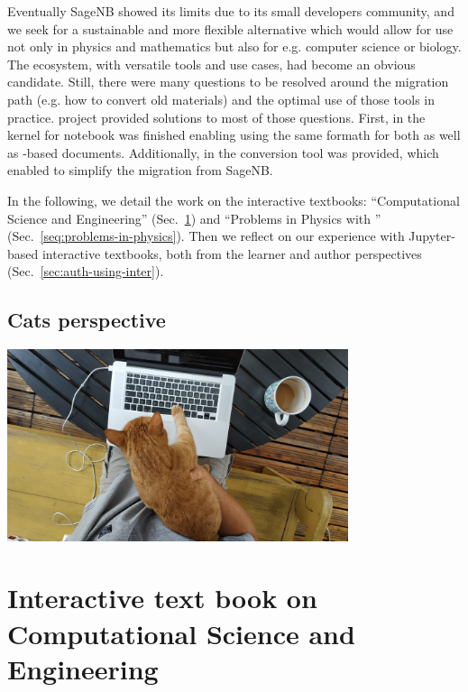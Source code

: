 \documentclass{deliverablereport}
\newcommand{\sagenb}{SageNB\xspace}
\begin{document}
Eventually \sagenb showed its limits due to its small developers
community, and we seek for a sustainable and more flexible alternative
which would allow for use not only in physics and mathematics but also
for e.g. computer science or biology. The \Jupyter ecosystem, with
versatile tools and use cases, had become an obvious candidate. Still,
there were many questions to be resolved around the migration path
(e.g. how to convert old materials) and the optimal use of those tools
in practice.  \ODK project provided solutions to most of those
questions. First, in  the
\SageMath kernel for \Jupyter notebook was finished enabling using the
same formath for both \Sage as well as \Python-based
documents. Additionally, in  the
conversion tool was provided, which enabled to simplify the migration
from \sagenb. 

In the following, we detail the work on the interactive textbooks:
``Computational Science and Engineering'' (Sec.~\ref{sec:computational-science-and-engineering})
and ``Problems in Physics with \SageMath'' (Sec.~\ref{seq:problems-in-physics}).
Then we reflect on our experience with Jupyter-based interactive
textbooks, both from the learner and author perspectives (Sec.~\ref{sec:auth-using-inter}).

\subsection{Cats perspective}
\includegraphics[width=10cm]{cat.jpg}




\section{Interactive text book on Computational Science and Engineering}
\label{sec:computational-science-and-engineering}
\end{document}
